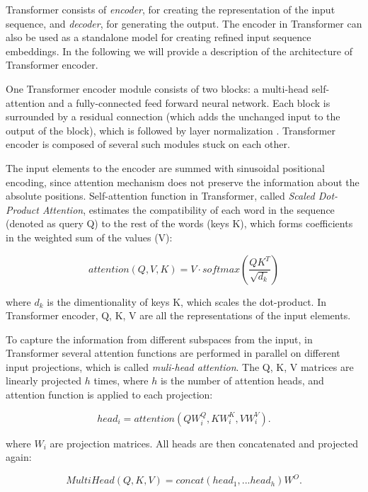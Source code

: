 Transformer consists of \textit{encoder}, for creating the representation of the input sequence, and \textit{decoder}, for generating the output. The encoder in Transformer can also be used as a standalone model for creating refined input sequence embeddings. In the following we will provide a description of the architecture of Transformer encoder.  

One Transformer encoder module consists of two blocks: a multi-head self-attention and a fully-connected feed forward neural network. Each block is surrounded by a residual connection \cite{he2016deep} (which adds the unchanged input to the output of the block), which is followed by layer normalization \cite{ba2016layer}. Transformer encoder is composed of several such modules stuck on each other.

The input elements to the encoder are summed with sinusoidal positional encoding, since attention mechanism does not preserve the information about the absolute positions. Self-attention function in Transformer, called \textit{Scaled Dot-Product Attention}, estimates the compatibility of each word in the sequence (denoted as query Q) to the rest of the words (keys K), which forms coefficients in the weighted sum of the values (V):

\begin{equation}
    attention(Q,V,K) = V \cdot softmax(\frac{QK^T}{\sqrt{d_k}})
\end{equation}
 
where $d_k$ is the dimentionality of keys K, which scales the dot-product. In Transformer encoder, Q, K, V are all the representations of the input elements.

To capture the information from different subspaces from the input, in Transformer several attention functions are performed in parallel on different input projections, which is called \textit{muli-head attention}. The Q, K, V matrices are linearly projected $h$ times, where $h$ is the number of attention heads, and attention function is applied to each projection:

\begin{equation}
    head_i = attention(QW_i^Q,KW_i^K,VW_i^V).
\end{equation}

where $W_i$ are projection matrices. All heads are then concatenated and projected again:

\begin{equation}
    MultiHead(Q, K, V) = concat(head_1,...head_h)W^O.
\end{equation}

